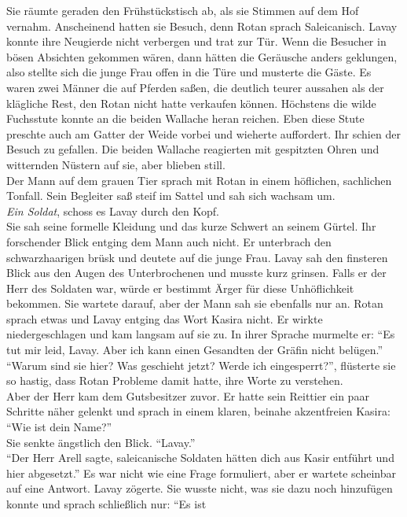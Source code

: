 Sie räumte geraden den Frühstückstisch ab, als sie Stimmen auf dem Hof vernahm. Anscheinend hatten 
sie Besuch, denn Rotan sprach Saleicanisch. Lavay konnte ihre Neugierde nicht verbergen und trat 
zur Tür. Wenn die Besucher in bösen Absichten gekommen wären, dann hätten die Geräusche anders 
geklungen, also stellte sich die junge Frau offen in die Türe und musterte die Gäste. Es waren zwei 
Männer die auf Pferden saßen, die deutlich teurer aussahen als der klägliche Rest, den Rotan nicht 
hatte verkaufen können. Höchstens die wilde Fuchsstute konnte an die beiden Wallache heran reichen. 
Eben diese Stute preschte auch am Gatter der Weide vorbei und wieherte auffordert. Ihr schien der 
Besuch zu gefallen. Die beiden Wallache reagierten mit gespitzten Ohren und witternden Nüstern auf 
sie, aber blieben still.\\
Der Mann auf dem grauen Tier sprach mit Rotan in einem höflichen, sachlichen Tonfall. Sein Begleiter 
saß steif im Sattel und sah sich wachsam um.\\
\textit{Ein Soldat}, schoss es Lavay durch den Kopf.\\
Sie sah seine formelle Kleidung und das kurze Schwert an seinem Gürtel. Ihr forschender Blick 
entging dem Mann auch nicht. Er unterbrach den schwarzhaarigen brüsk und deutete auf die junge 
Frau. Lavay sah den finsteren Blick aus den Augen des Unterbrochenen und musste kurz grinsen. Falls 
er der Herr des Soldaten war, würde er bestimmt Ärger für diese Unhöflichkeit bekommen. Sie wartete 
darauf, aber der Mann sah sie ebenfalls nur an. Rotan sprach etwas und Lavay entging das Wort Kasira 
nicht. Er wirkte niedergeschlagen und kam langsam auf sie zu. In ihrer Sprache murmelte er: ``Es 
tut mir leid, Lavay. Aber ich kann einen Gesandten der Gräfin nicht belügen.''\\
``Warum sind sie hier? Was geschieht jetzt? Werde ich eingesperrt?'', flüsterte sie so hastig, dass 
Rotan Probleme damit hatte, ihre Worte zu verstehen.\\
Aber der Herr kam dem Gutsbesitzer zuvor. Er hatte sein Reittier ein paar Schritte näher gelenkt 
und sprach in einem klaren, beinahe akzentfreien Kasira: ``Wie ist dein Name?''\\
Sie senkte ängstlich den Blick. ``Lavay.''\\
``Der Herr Arell sagte, saleicanische Soldaten hätten dich aus Kasir entführt und hier abgesetzt.''
Es war nicht wie eine Frage formuliert, aber er wartete scheinbar auf eine Antwort. Lavay zögerte. 
Sie wusste nicht, was sie dazu noch hinzufügen konnte und sprach schließlich nur: ``Es ist 

